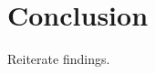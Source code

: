 \documentclass[modern]{aastex62}
\begin{document}
\section{Conclusion} \label{sec:conclusion}
Reiterate findings.

\clearpage


\end{document}
